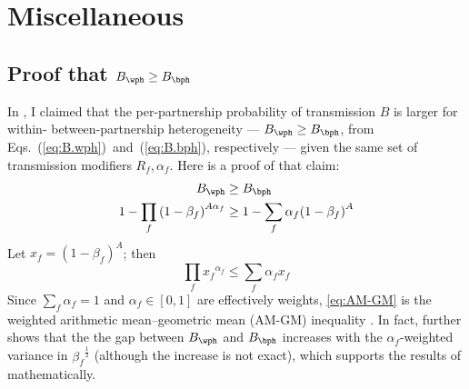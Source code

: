 \section{Miscellaneous}\label{app.math.misc}
\subsection{Proof that $B_{\wph} \ge B_{\bph}$}\label{app.math.misc.xph}
In , I claimed that
the per-partnership probability of transmission $B$ is larger for
within- \vs between-partnership heterogeneity
--- $B_{\wph} \ge B_{\bph}$, from Eqs.~(\ref{eq:B.wph})~and~(\ref{eq:B.bph}), respectively ---
given the same set of transmission modifiers $R_f, \alpha_f$.
Here is a proof of that claim:
\begin{equation}
  \begin{aligned}
    B_{\wph} &\ge B_{\bph} \\
    1 - \prod_f {(1 - \beta_f)}^{A\alpha_f} &\ge 1 - \sum_f \alpha_f {(1 - \beta_f)}^{A}
  \end{aligned}
\end{equation}
Let $x_f = {(1 - \beta_f)}^A$; then
\begin{equation}\label{eq:AM-GM}
  \prod_f {x_f}^{\alpha_f} \le \sum_f \alpha_f x_f
\end{equation}
Since $\sum_f \alpha_f = 1$ and $\alpha_f \in [0,1]$ are effectively weights,
\eqref{eq:AM-GM} is the weighted arithmetic mean--geometric mean (AM-GM) inequality \cite{Aldaz2009}.
In fact, \citet{Aldaz2009} further shows that the the gap between $B_{\wph}$ and $B_{\bph}$
increases with the $\alpha_f$-weighted variance in ${\beta_f}^{\frac12}$
(although the increase is not exact),
which supports the results of  mathematically.
